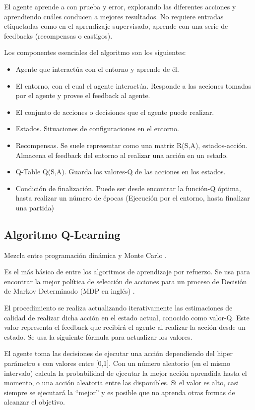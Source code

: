 	El agente aprende a con prueba y error, explorando las diferentes acciones y aprendiendo cuáles conducen a mejores resultados. No requiere entradas etiquetadas como en el aprendizaje supervisado, aprende con una serie de feedbacks (recompensas o castigos).

	\begin{flushleft}
		Los componentes esenciales del algoritmo son los siguientes:
	\end{flushleft}
	\begin{itemize}
		\item Agente que interactúa con el entorno y aprende de él. 
		\item El entorno, con el cual el agente interactúa. Responde a las acciones tomadas por el agente y provee el feedback al agente.
		\item El conjunto de acciones o decisiones que el agente puede realizar.
		\item Estados. Situaciones de configuraciones en el entorno.
		\item Recompensas. Se suele representar como una matriz R(S,A), estados-acción. Almacena el feedback del entorno al realizar una acción en un estado.
		\item Q-Table Q(S,A). Guarda los valores-Q de las acciones en los estados.
		\item Condición de finalización. Puede ser desde encontrar la función-Q óptima, hasta realizar un número de épocas (Ejecución por el entorno, hasta finalizar una partida)
	\end{itemize}


	\subsection{Algoritmo Q-Learning} 
		Mezcla entre programación dinámica y Monte Carlo \cite{wang2012monte}.
		
		Es el más básico de entre los algoritmos de aprendizaje por refuerzo. Se usa para encontrar la mejor política de selección de acciones para un proceso de Decisión de Markov Determinado (MDP en inglés) \cite{garcia2013markov}. 
		
		El procedimiento se realiza actualizando iterativamente las estimaciones de calidad de realizar dicha acción en el estado actual, conocido como valor-Q. Este valor representa el feedback que recibirá el agente al realizar la acción desde un estado. Se usa la siguiente fórmula para actualizar los valores.
		
		El agente toma las decisiones de ejecutar una acción dependiendo del hiper parámetro $\epsilon$  con valores entre [0,1]. Con un número aleatorio (en el mismo intervalo) calcula la probabilidad de ejecutar la mejor acción aprendida hasta el momento, o una acción aleatoria entre las disponibles. Si el valor es alto, casi siempre se ejecutará la “mejor” y es posible que no aprenda otras formas de alcanzar el objetivo.


